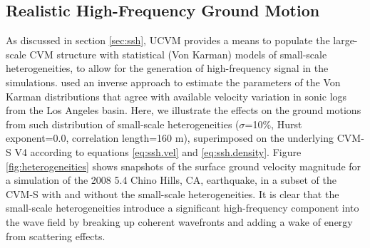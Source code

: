 
\subsection{Realistic High-Frequency Ground Motion}

As discussed in section \ref{sec:ssh}, UCVM provides a means to populate the large-scale CVM structure with statistical (Von Karman) models of small-scale heterogeneities, to allow for the generation of high-frequency signal in the simulations. \citet{Olsen_2014_USGS} used an inverse approach to estimate the parameters of the Von Karman distributions that agree with available velocity variation in sonic logs from the Los Angeles basin. Here, we illustrate the effects on the ground motions from such distribution of small-scale heterogeneities ($\sigma$=10\%, Hurst exponent=0.0, correlation length=160 m), superimposed on the underlying CVM-S V4 according to equations \eqref{eq:ssh.vel} and \eqref{eq:ssh.density}. Figure \ref{fig:heterogeneities} shows snapshots of the surface ground velocity magnitude for a simulation of the 2008  5.4 Chino Hills, CA, earthquake, in a subset of the CVM-S with and without the small-scale heterogeneities.  It is clear that the small-scale heterogeneities introduce a significant high-frequency component into the wave field by breaking up coherent wavefronts and adding a wake of energy from scattering effects.



